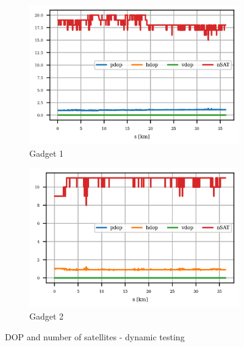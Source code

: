 \documentclass{article}
\begin{document}
			\begin{figure}[h]
		   		\centering
		     	\begin{subfigure}[b]{0.45\textwidth}
		      		\centering
		      	   \includegraphics[width=\textwidth]{Dynamic/cond_dop_U-blox M8N.png}
		      	   \caption{Gadget 1}
		      	   \label{fig:dyn_dop_gadget1}
		     	\end{subfigure}
		     	\begin{subfigure}[b]{0.45\textwidth}
		      	   \centering
		      	   \includegraphics[width=\textwidth]{Dynamic/cond_dop_MTK 3339.png}
		      	   \caption{Gadget 2}
		      	   \label{fig:dyn_dop_gadget2}
		     	\end{subfigure}
		      \caption{DOP and number of satellites - dynamic testing}
		      \label{fig:dyn_dop_gadgets}
			\end{figure}
\end{document}
